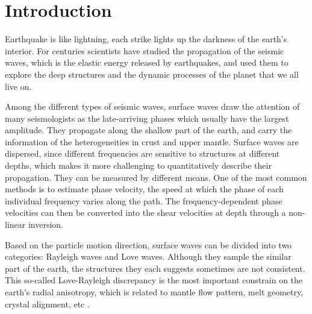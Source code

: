 \documentclass[12pt,oneside]{book}
\begin{document}


\mainmatter


\singlespacing
\chapter{Introduction}
\label{ch:intro}
\doublespacing

\pagestyle{fancy}
\chead{}
\cfoot{\thepage}
\renewcommand{\headrulewidth}{0pt} %
\thispagestyle{fancy}

Earthquake is like lightning, each strike lights up the darkness of the earth's interior. For centuries scientists have studied the propagation of the seismic waves, which is the elastic energy released by earthquakes, and used them to explore the deep structures and the dynamic processes of the planet that we all live on. 

Among the different types of seismic waves, surface waves draw the attention of many seismologists as the late-arriving phases which usually have the largest amplitude. They propagate along the shallow part of the earth, and carry the information of the heterogeneities in crust and upper mantle.
Surface waves are dispersed, since different frequencies are sensitive to  structures at different depths, which makes it more challenging to quantitatively describe their propagation. 
They can be measured by different means. One of the most common methods is to estimate phase velocity, the speed at which the phase of each individual frequency varies along the path. 
The frequency-dependent phase velocities can then be converted into the shear velocities at depth through a non-linear inversion.

Based on the particle motion direction, surface waves can be divided into two categories: Rayleigh waves and Love waves. Although they sample the similar part of the earth, the structures they each suggests sometimes are not consistent. This so-called Love-Rayleigh discrepancy is the most important constrain on the earth's radial anisotropy, which is related to mantle flow pattern, melt geometry, crystal alignment, etc \citep[e.g.][]{Gaherty:2004is,Gaherty:2007cc,Holtzman:2010fta}.
\end{document}
